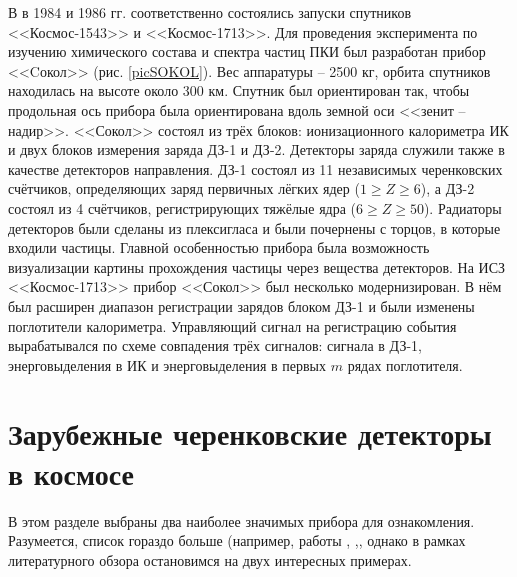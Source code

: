 \documentclass[12pt,a4paper]{report} %
\begin{document}
В в 1984 и 1986 гг. соответственно состоялись запуски спутников <<Космос-1543>> и <<Космос-1713>>. Для проведения эксперимента по изучению химического состава и спектра частиц ПКИ был разработан прибор <<Cокол>> (рис. \ref{picSOKOL}). 
Вес аппаратуры – 2500 кг, орбита спутников находилась на высоте около 300 км. 
Спутник был ориентирован так, чтобы продольная ось прибора была ориентирована вдоль земной оси <<зенит – надир>>. <<Сокол>> состоял из трёх блоков: ионизационного калориметра ИК и двух блоков измерения заряда ДЗ-1 и ДЗ-2. Детекторы заряда служили также в качестве детекторов направления. ДЗ-1 состоял из 11 независимых черенковских счётчиков, определяющих заряд первичных лёгких ядер ($1\geq Z\geq 6$), а ДЗ-2 состоял из 4 счётчиков, регистрирующих тяжёлые ядра ($6\geq Z\geq 50$). Радиаторы детекторов были сделаны из плексигласа и были почернены с торцов, в которые входили частицы.
Главной особенностью прибора была возможность визуализации картины прохождения частицы через вещества детекторов.
На ИСЗ <<Космос-1713>> прибор <<Сокол>> был несколько модернизирован. В нём был расширен диапазон регистрации зарядов блоком ДЗ-1 и были изменены поглотители калориметра. Управляющий сигнал на регистрацию события вырабатывался по схеме совпадения трёх сигналов: сигнала в ДЗ-1, энерговыделения в ИК и энерговыделения в первых $m$ рядах поглотителя.
\section{Зарубежные черенковские детекторы в космосе}
В этом разделе выбраны два наиболее значимых прибора для ознакомления. Разумеется, список гораздо больше (например, работы \cite{Shuttle}, \cite{ESRO2},\cite{ISEE3}, однако в рамках литературного обзора остановимся на двух интересных примерах.
\end{document}
